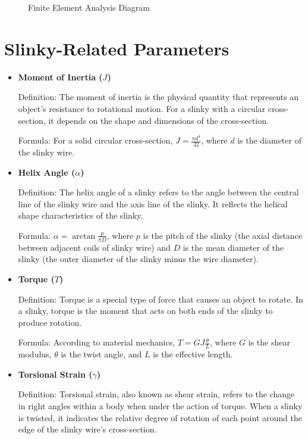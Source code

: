\documentclass{mcmthesis}  %
\begin{document}
\begin{appendices}
\begin{figure}[h!]
    \centering
    \caption{Finite Element Analysis Diagram}
    \label{fig:finite_element_analysis}
\end{figure}

\section{Slinky-Related Parameters}  %

\begin{itemize}
    \item \textbf{Moment of Inertia ($J$)}
    
    Definition: The moment of inertia is the physical quantity that represents an object's resistance to rotational motion. For a slinky with a circular cross-section, it depends on the shape and dimensions of the cross-section.
    
    Formula: For a solid circular cross-section, $J = \frac{\pi d^4}{32}$, where $d$ is the diameter of the slinky wire.

    \item \textbf{Helix Angle ($\alpha$)}
    
    Definition: The helix angle of a slinky refers to the angle between the central line of the slinky wire and the axis line of the slinky. It reflects the helical shape characteristics of the slinky.
    
    Formula: $\alpha = \arctan \frac{p}{\pi D}$, where $p$ is the pitch of the slinky (the axial distance between adjacent coils of slinky wire) and $D$ is the mean diameter of the slinky (the outer diameter of the slinky minus the wire diameter).

    \item \textbf{Torque ($T$)}
    
    Definition: Torque is a special type of force that causes an object to rotate. In a slinky, torque is the moment that acts on both ends of the slinky to produce rotation.
    
    Formula: According to material mechanics, $T = GJ\frac{\theta}{L}$, where $G$ is the shear modulus, $\theta$ is the twist angle, and $L$ is the effective length.

    \item \textbf{Torsional Strain ($\gamma$)}
    
    Definition: Torsional strain, also known as shear strain, refers to the change in right angles within a body when under the action of torque. When a slinky is twisted, it indicates the relative degree of rotation of each point around the edge of the slinky wire's cross-section.
    

\end{itemize}
\end{appendices}
\end{document}
